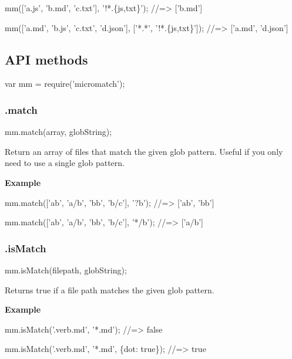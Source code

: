 \begin{DoxyCode}
mm(['a.js', 'b.md', 'c.txt'], '!*.\{js,txt\}');
//=> ['b.md']

mm(['a.md', 'b.js', 'c.txt', 'd.json'], ['*.*', '!*.\{js,txt\}']);
//=> ['a.md', 'd.json']
\end{DoxyCode}






\subsection*{A\+PI methods}


\begin{DoxyCode}
var mm = require('micromatch');
\end{DoxyCode}


\subsubsection*{.match}


\begin{DoxyCode}
mm.match(array, globString);
\end{DoxyCode}


Return an array of files that match the given glob pattern. Useful if you only need to use a single glob pattern.

{\bfseries Example}


\begin{DoxyCode}
mm.match(['ab', 'a/b', 'bb', 'b/c'], '?b');
//=> ['ab', 'bb']

mm.match(['ab', 'a/b', 'bb', 'b/c'], '*/b');
//=> ['a/b']
\end{DoxyCode}


\subsubsection*{.is\+Match}


\begin{DoxyCode}
mm.isMatch(filepath, globString);
\end{DoxyCode}


Returns true if a file path matches the given glob pattern.

{\bfseries Example}


\begin{DoxyCode}
mm.isMatch('.verb.md', '*.md');
//=> false

mm.isMatch('.verb.md', '*.md', \{dot: true\});
//=> true
\end{DoxyCode}


